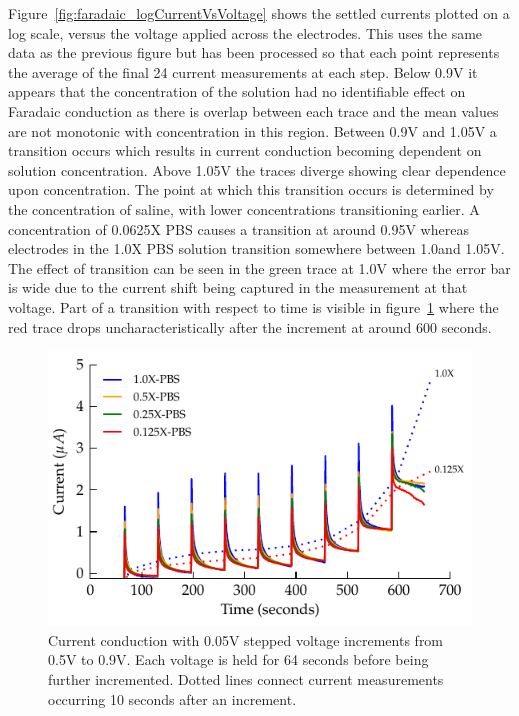 \documentclass[journal, a4paper]{IEEEtran}
\begin{document}
Figure~\ref{fig:faradaic_logCurrentVsVoltage} shows the settled currents plotted on a log scale, versus the voltage applied across the electrodes. This uses the same data as the previous figure but has been processed so that each point represents the average of the final 24 current measurements at each step. Below 0.9\thinspace V it appears that the concentration of the solution had no identifiable effect on Faradaic conduction as there is overlap between each trace and the mean values are not monotonic with concentration in this region.  Between 0.9\thinspace V and 1.05\thinspace V a transition occurs which results in current conduction becoming dependent on solution concentration.
Above 1.05\thinspace V the traces diverge showing clear dependence upon concentration.
The point at which this transition occurs is determined by the concentration of saline, with lower concentrations transitioning earlier. A concentration of 0.0625X PBS causes a transition at around 0.95\thinspace V whereas electrodes in the 1.0X PBS solution transition somewhere between 1.0\thinspace and 1.05\thinspace V. The effect of transition can be seen in the green trace at 1.0\thinspace V where the error bar is wide due to the current shift being captured in the measurement at that voltage. Part of a transition with respect to time is visible in figure~\ref{fig:StepResponse_Faradaic} where the red trace drops uncharacteristically after the increment at around 600 seconds.

\begin{figure}
    \begin{center}
        \includegraphics{graphics/currentTimeFaradaicCPE_Stacked_IEEE}
    \end{center}
    \caption{Current conduction with 0.05\thinspace V stepped voltage increments from 0.5\thinspace V to 0.9V. Each voltage is held for 64 seconds before being further incremented. Dotted lines connect current measurements occurring 10 seconds after an increment.}
    \label{fig:StepResponse_Faradaic}
\end{figure}
\end{document}
